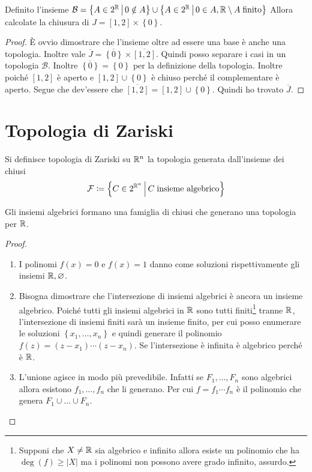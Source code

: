 \begin{theorem}
	Definito l'insieme $\mathcal{B} = \left\{A \in 2^{\mathbb{R}} \,\middle|\, 0 \notin A \right\} \cup \left\{ A \in 2^{\mathbb{R}} \,\middle|\, 0 \in A, \mathbb{R} \setminus A \; \text{finito} \right\}$ Allora calcolate la chiusura di $J = \left[1,2\right] \times \left\{0\right\}$.
\end{theorem}
\begin{proof}
	È ovvio dimostrare che l'insieme oltre ad essere una base è anche una topologia. Inoltre vale $\overline{J} = \overline{\left\{0\right\}} \times \overline{\left[1,2\right]}$. Quindi posso separare i casi in un topologia $\mathcal{B}$. Inoltre $\overline{\left\{0\right\}} = \left\{0\right\}$ per la definizione della topologia. Inoltre poiché $\left[1,2\right]$ è aperto e $\left[1,2\right] \cup \left\{0\right\}$ è chiuso perché il complementare è aperto. Segue che dev'essere che $\overline{\left[1,2\right]} = \left[1,2\right] \cup \left\{0\right\}$. Quindi ho trovato $\overline{J}$.
\end{proof}


\section{Topologia di Zariski}

\begin{definition}
	Si definisce topologia di Zariski su $\mathbb{R}^n$ la topologia generata dall'insieme dei chiusi 
	\begin{equation*}
	\mathcal{F} \coloneqq \left\{ C \in 2^{\mathbb{R}^n} \,\middle|\, C \; \text{insieme algebrico} \right\}
	\end{equation*}
\end{definition}

\begin{theorem}
	Gli insiemi algebrici formano una famiglia di chiusi che generano una topologia per $\mathbb{R}$.
\end{theorem}
\begin{proof}
	\begin{enumerate}
		\item I polinomi $f(x) = 0$ e $f(x) = 1$ danno come soluzioni rispettivamente gli insiemi $\mathbb{R}, \varnothing$.
		\item Bisogna dimostrare che l'intersezione di insiemi algebrici è ancora un insieme algebrico. Poiché tutti gli insiemi algebrici in $\mathbb{R}$ sono tutti finiti\footnote{Supponi che $X \neq \mathbb{R}$ sia algebrico e infinito allora esiste un polinomio che ha $\deg(f) \ge |X|$ ma i polinomi non possono avere grado infinito, assurdo.} tranne $\mathbb{R}$, l'intersezione di insiemi finiti sarà un insieme finito, per cui posso enumerare le soluzioni $\left\{x_1, \dots, x_n\right\}$ e quindi generare il polinomio $f(z) = (z-x_1)\cdots(z-x_n)$. Se l'intersezione è infinita è algebrico perché è $\mathbb{R}$. 
		\item L'unione agisce in modo più prevedibile. Infatti se $F_1, \dots, F_n$ sono algebrici allora esistono $f_1, \dots, f_n$ che li generano. Per cui $f = f_1 \cdots f_n$ è il polinomio che genera $F_1 \cup \dots \cup F_n$.
	\end{enumerate}
\end{proof}


